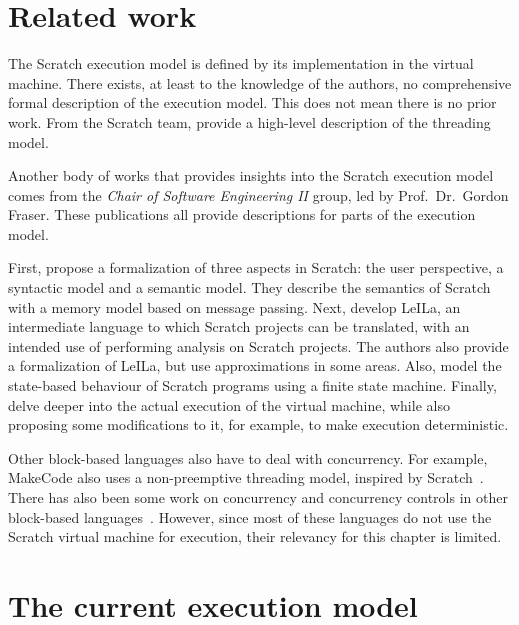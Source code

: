 \documentclass[../main]{subfiles}
\begin{document}
\section{Related work}\label{sec:execution-related-work}

The Scratch execution model is defined by its implementation in the virtual machine.
There exists, at least to the knowledge of the authors, no comprehensive formal description of the execution model.
This does not mean there is no prior work.
From the Scratch team, \textcite{maloneyScratchProgrammingLanguage2010} provide a high-level description of the threading model.

Another body of works that provides insights into the Scratch execution model comes from the \emph{Chair of Software Engineering II} group, led by Prof.\ Dr.\ Gordon Fraser.
These publications all provide descriptions for parts of the execution model.

First, \textcite{stahlbauerTestingScratchPrograms2019} propose a formalization of three aspects in Scratch: the user perspective, a syntactic model and a semantic model.
They describe the semantics of Scratch with a memory model based on message passing.
Next, \textcite{stahlbauerVerifiedScratchProgram2020} develop LeILa, an intermediate language to which Scratch projects can be translated, with an intended use of performing analysis on Scratch projects.
The authors also provide a formalization of LeILa, but use approximations in some areas.
Also, \textcite{gotzModelbasedTestingScratch2022} model the state-based behaviour of Scratch programs using a finite state machine.
Finally, \textcite{deinerAutomatedTestGeneration2023} delve deeper into the actual execution of the virtual machine, while also proposing some modifications to it, for example, to make execution deterministic.

Other block-based languages also have to deal with concurrency.
For example, MakeCode also uses a non-preemptive threading model, inspired by Scratch~\autocite{ballMicrosoftMakeCodeEmbedded2019}.
There has also been some work on concurrency and concurrency controls in other block-based languages~\autocite{chungConCodeItComparisonConcurrency2020}.
However, since most of these languages do not use the Scratch virtual machine for execution, their relevancy for this chapter is limited.

\section{The current execution model}\label{sec:the-current-execution-model}
\end{document}
